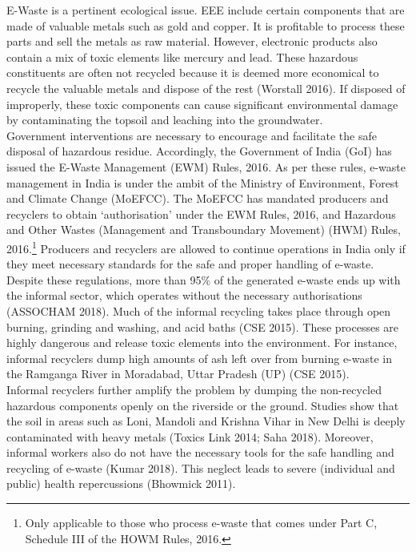 \documentclass[a4paper, 12pt]{article}
\begin{document}
                    E-Waste is a pertinent ecological issue. EEE include certain components that are made of valuable metals such as gold and copper. It is profitable to process these parts and sell the metals as raw material. However, electronic products also contain a mix of toxic elements like mercury and lead. These hazardous constituents are often not recycled because it is deemed more economical to recycle the valuable metals and dispose of the rest (Worstall 2016). If disposed of improperly, these toxic components can cause significant environmental damage by contaminating the topsoil and leaching into the groundwater. \\
                    
                    Government interventions are necessary to encourage and facilitate the safe disposal of hazardous residue. Accordingly, the Government of India (GoI) has issued the E-Waste Management (EWM) Rules, 2016. As per these rules, e-waste management in India is under the ambit of the Ministry of Environment, Forest and Climate Change (MoEFCC). The MoEFCC has mandated producers and recyclers to obtain ‘authorisation’ under the EWM Rules, 2016, and Hazardous and Other Wastes (Management and Transboundary Movement) (HWM) Rules, 2016.\footnote{Only applicable to those who process e-waste that comes under Part C, Schedule III of the HOWM Rules, 2016.} Producers and recyclers are allowed to continue operations in India only if they meet necessary standards for the safe and proper handling of e-waste. \\
                     
                     Despite these regulations, more than 95\% of the generated e-waste ends up with the informal sector, which operates without the necessary authorisations (ASSOCHAM 2018). Much of the informal recycling takes place through open burning, grinding and washing, and acid baths (CSE 2015). These processes are highly dangerous and release toxic elements into the environment. For instance, informal recyclers dump high amounts of ash left over from burning e-waste in the Ramganga River in Moradabad, Uttar Pradesh (UP) (CSE 2015). \\
                    
                    Informal recyclers further amplify the problem by dumping the non-recycled hazardous components openly on the riverside or the ground. Studies show that the soil in areas such as Loni, Mandoli and Krishna Vihar in New Delhi is deeply contaminated with heavy metals (Toxics Link 2014; Saha 2018). Moreover, informal workers also do not have the necessary tools for the safe handling and recycling of e-waste (Kumar 2018). This neglect leads to severe (individual and public) health repercussions (Bhowmick 2011). \\
                    
\end{document}
